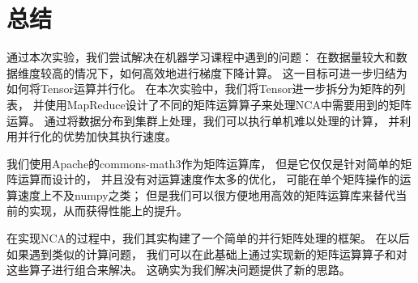 \documentclass[a4paper,UTF8]{article}
\theoremstyle{definition}
\begin{document}
\section*{总结}

通过本次实验，我们尝试解决在机器学习课程中遇到的问题：
在数据量较大和数据维度较高的情况下，如何高效地进行梯度下降计算。
这一目标可进一步归结为如何将Tensor运算并行化。
在本次实验中，我们将Tensor进一步拆分为矩阵的列表，
并使用MapReduce设计了不同的矩阵运算算子来处理NCA中需要用到的矩阵运算。
通过将数据分布到集群上处理，我们可以执行单机难以处理的计算，
并利用并行化的优势加快其执行速度。

我们使用Apache的commons-math3作为矩阵运算库，
但是它仅仅是针对简单的矩阵运算而设计的，
并且没有对运算速度作太多的优化，
可能在单个矩阵操作的运算速度上不及numpy之类；
但是我们可以很方便地用高效的矩阵运算库来替代当前的实现，从而获得性能上的提升。

在实现NCA的过程中，我们其实构建了一个简单的并行矩阵处理的框架。
在以后如果遇到类似的计算问题，
我们可以在此基础上通过实现新的矩阵运算算子和对这些算子进行组合来解决。
这确实为我们解决问题提供了新的思路。

\nocite{*}

\end{document}
